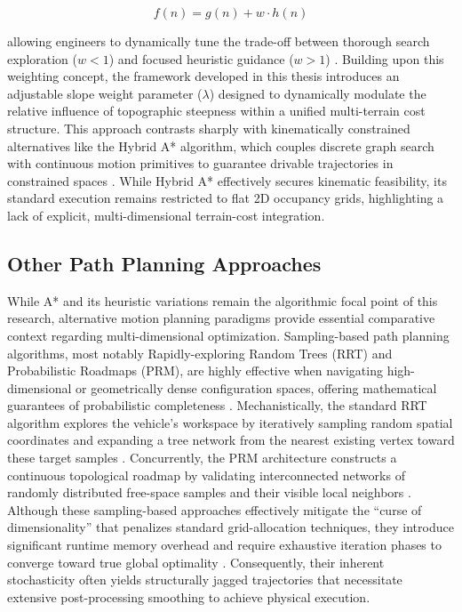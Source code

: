\begin{equation}
    f(n) = g(n) + w \cdot h(n)
\end{equation}

\noindent allowing engineers to dynamically tune the trade-off between thorough search exploration ($w < 1$) and focused heuristic guidance ($w > 1$) \citep{Yao_2010_pathplanning}. Building upon this weighting concept, the framework developed in this thesis introduces an adjustable slope weight parameter ($\lambda$) designed to dynamically modulate the relative influence of topographic steepness within a unified multi-terrain cost structure. This approach contrasts sharply with kinematically constrained alternatives like the Hybrid A* algorithm, which couples discrete graph search with continuous motion primitives to guarantee drivable trajectories in constrained spaces \citep{Meng_2023_improvedhybrid}. While Hybrid A* effectively secures kinematic feasibility, its standard execution remains restricted to flat 2D occupancy grids, highlighting a lack of explicit, multi-dimensional terrain-cost integration.

\subsection{Other Path Planning Approaches}

While A* and its heuristic variations remain the algorithmic focal point of this research,
alternative motion planning paradigms provide essential comparative context regarding
multi-dimensional optimization. Sampling-based path planning algorithms, most notably
Rapidly-exploring Random Trees (RRT) and Probabilistic Roadmaps (PRM), are highly effective when
navigating high-dimensional or geometrically dense configuration spaces, offering mathematical
guarantees of probabilistic completeness \citep{Li_2020_pqrrtimproved, SanchezIbanez_2021_pathplanning}. Mechanistically, the standard RRT
algorithm explores the vehicle's workspace by iteratively sampling random spatial coordinates and
expanding a tree network from the nearest existing vertex toward these target samples \citep{Li_2020_pqrrtimproved,
Liu_2023_pathplanning}. Concurrently, the PRM architecture constructs a continuous topological roadmap by
validating interconnected networks of randomly distributed free-space samples and their visible
local neighbors \citep{SanchezIbanez_2021_pathplanning}. Although these sampling-based approaches effectively mitigate the
``curse of dimensionality'' that penalizes standard grid-allocation techniques, they introduce
significant runtime memory overhead and require exhaustive iteration phases to converge toward true
global optimality \citep{SanchezIbanez_2021_pathplanning}. Consequently, their inherent stochasticity often yields
structurally jagged trajectories that necessitate extensive post-processing smoothing to achieve
physical execution.

